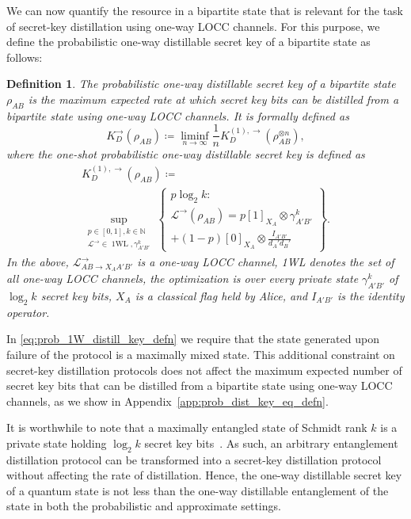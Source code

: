 \documentclass[twocolumn,letterpaper, dvipsnames,allowtoday, accepted = 2025-12-31]{quantumarticle}
\newtheorem{definition}{Definition}
\begin{document}
We can now quantify the resource in a bipartite state that is relevant for the task of secret-key distillation using one-way LOCC channels. For this purpose, we define the probabilistic one-way distillable secret key of a bipartite state as follows:
\begin{definition}
    The probabilistic one-way distillable secret key of a bipartite state $\rho_{AB}$ is the maximum expected rate at which secret key bits can be distilled from a bipartite state using one-way LOCC channels. It is formally defined as
    \begin{equation}
        K_{D}^{\to}(\rho_{AB}) \coloneqq \liminf_{n\to \infty} \frac{1}{n} K_{D}^{(1),\to}(\rho_{AB}^{\otimes n}),
    \end{equation}
    where the one-shot probabilistic one-way distillable secret key is defined as
    \begin{multline}\label{eq:prob_1W_distill_key_defn}
        K_{D}^{(1),\to}(\rho_{AB}) \coloneqq\\
        \sup_{\substack{p \in [0,1], k\in \mathbb{N}\\ \mathcal{L}^{\to} \in \operatorname{1WL}, \gamma^k_{A'B'}}}\left\{
        \begin{array}{c}
             p \log_2 k:\\
             \mathcal{L}^{\to}\!\left(\rho_{AB}\right) =
             p[1]_{X_A}\otimes\gamma^k_{A'B'} \\
             + (1-p)[0]_{X_A}\otimes\frac{I_{A'B'}}{d_A'd_B'}
        \end{array}
        \right\}.
    \end{multline}
    In the above, $\mathcal{L}^{\to}_{AB\to X_A A'B'}$ is a one-way LOCC channel, 1WL denotes the set of all one-way LOCC channels, the optimization is over every private state $ \gamma^k_{A'B'}$ of $\log_2 k$ secret key bits, $X_A$ is a classical flag held by Alice, and $I_{A'B'}$ is the identity operator.
\end{definition}


In \eqref{eq:prob_1W_distill_key_defn} we require that the state generated upon failure of the protocol is a maximally mixed state. This additional constraint on secret-key distillation protocols does not affect the maximum expected number of secret key bits that can be distilled from a bipartite state using one-way LOCC channels, as we show in Appendix~\ref{app:prob_dist_key_eq_defn}.

It is worthwhile to note that a maximally entangled state of Schmidt rank $k$ is a  private state holding $\log_2 k$ secret key bits~\cite{HHHO05, HHHO09}. As such, an arbitrary entanglement distillation protocol can be transformed into a secret-key distillation protocol without affecting the rate of distillation. Hence, the one-way distillable secret key of a quantum state is not less than the one-way distillable entanglement of the state in both the probabilistic and approximate settings. 
\end{document}
